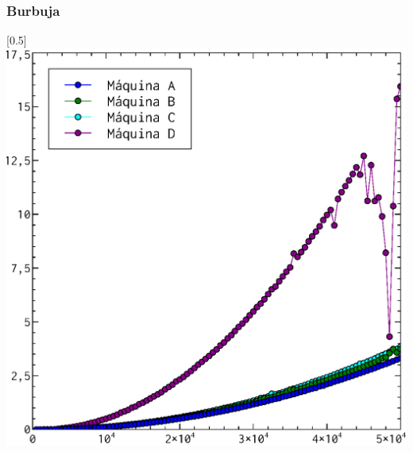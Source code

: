 \documentclass[compress]{beamer}
\begin{document}
\begin{frame}
\frametitle{Burbuja}
	\begin{center}
\scalebox{0.53}[0.5]{
    \includegraphics[]{burbuja_todos.eps}
}
\end{center}
\end{frame}
\end{document}
